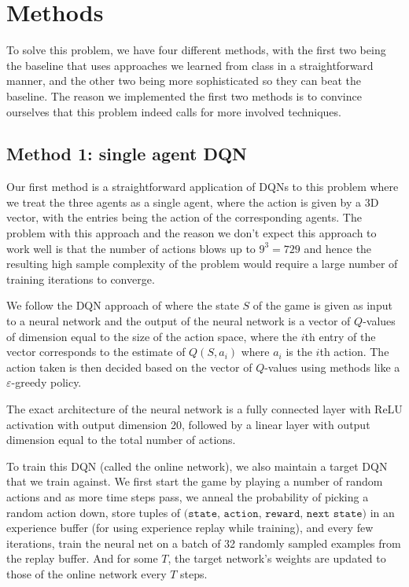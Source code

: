 \documentclass{article}
\begin{document}
\section{Methods}

To solve this problem, we have four different methods, with the
first two being the baseline that uses approaches we learned
from class in a straightforward manner, and the other two being
more sophisticated so they can beat the baseline. The
reason we implemented the first two methods is to
convince ourselves that
this problem indeed calls for more involved techniques.


\subsection{Method 1: single agent DQN}
Our first method is a straightforward application of
DQNs to this
problem where we treat the three agents as a single agent,
where the action is given by a 3D vector, with the
entries being the action of the corresponding agents.
The problem with this approach and the reason we don't expect
this approach to work well is that the number of actions blows
up to $9^3=729$ and hence the resulting high sample complexity
of the problem would require a large number of training
iterations to converge.

We follow the DQN approach of \cite{mnih2013playing}
where the state $S$ of the game is given as input to a
neural network and the output of the neural network
is a vector of $Q$-values of dimension equal to the
size of the action space, where the $i$th entry of the
vector corresponds to the estimate of $Q(S,a_i)$ where $a_i$
is the $i$th action. The action taken is then decided
based on the vector of $Q$-values using methods like
a $\varepsilon$-greedy policy.

The exact architecture of the neural network is
a fully connected layer with ReLU activation
with output dimension 20, followed by
a linear layer with output dimension
equal to the total number of actions.

To train this DQN (called the online network), we also maintain
a target DQN that we train against. We first start the game
by playing a number of random actions and as
more time steps pass, we anneal the
probability of picking a random action down,
store tuples of 
$\texttt{(state, action, reward, next state)}$
in an experience buffer (for using experience
replay while training), and every few iterations,
train the neural net on a batch of 32 randomly
sampled examples from the replay buffer. And
for some $T$, the target network's weights
are updated to those of the online network every
$T$ steps.
\end{document}
